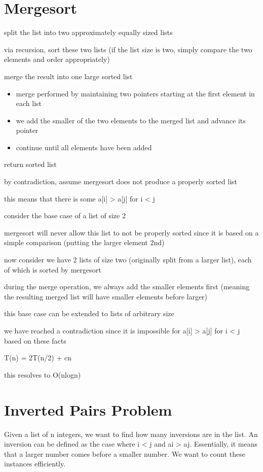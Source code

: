 \section{Mergesort}
\algorithm
{
    \item split the list into two approximately equally sized lists
    \item via recursion, sort these two lists (if the list size is two, simply compare the two elements and order appropriately)
    \item merge the result into one large sorted list
    \begin{itemize}
        \item merge performed by maintaining two pointers starting at the first element in each list
        \item we add the smaller of the two elements to the merged list and advance its pointer
        \item continue until all elements have been added
    \end{itemize}
    \item return sorted list
}
{
    \item by contradiction, assume mergesort does not produce a properly sorted list
    \item this means that there is some a[i] > a[j] for i < j
    \item consider the base case of a list of size 2
    \item mergesort will never allow this list to not be properly sorted since it is based on a simple comparison (putting the larger element 2nd)
    \item now consider we have 2 lists of size two (originally split from a larger list), each of which is sorted by mergesort
    \item during the merge operation, we always add the smaller elements first (meaning the resulting merged list will have smaller elements before larger)
    \item this base case can be extended to lists of arbitrary size
    \item we have reached a contradiction since it is impossible for a[i] > a[j] for i < j based on these facts

}
{
    \item T(n) = 2T(n/2) + cn
    \item this resolves to O(nlogn)
    
}


\section{Inverted Pairs Problem}
Given a list of n integers, we want to find how many inversions are in the list. An inversion can be defined as the case where i < j and ai > aj. Essentially, it means that a larger number comes before a smaller number. We want to count these instances efficiently. 

